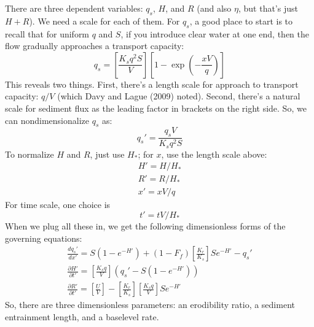 \documentclass[12pt]{amsart}
\begin{document}
There are three dependent variables: $q_s$, $H$, and $R$ (and also $\eta$, but that's just $H+R$). We need a scale for each of them. For $q_s$, a good place to start is to recall that for uniform $q$ and $S$, if you introduce clear water at one end, then the flow gradually approaches a transport capacity:
\begin{equation}
q_s = \left[ \frac{K_s q^2 S}{V} \right] \left[ 1 - \exp \left( -\frac{x V}{q} \right) \right]
\end{equation}
This reveals two things. First, there's a length scale for approach to transport capacity: $q/V$ (which Davy and Lague (2009) noted). Second, there's a natural scale for sediment flux as the leading factor in brackets on the right side. So, we can nondimensionalize $q_s$ as:
\begin{equation}
q_s' = \frac{q_s V}{K_s q^2 S}
\end{equation}
To normalize $H$ and $R$, just use $H_*$; for $x$, use the length scale above:
\begin{eqnarray}
H' = H / H_* \\
R' = R / H_* \\
x' = x V / q
\end{eqnarray}
For time scale, one choice is 
\begin{equation}
t' = t V / H_*
\end{equation}
When we plug all these in, we get the following dimensionless forms of the governing equations:
\begin{eqnarray}
\frac{dq_s'}{dx'} = S \left( 1 - e^{-H'} \right) + (1-F_f) \left[ \frac{K_r}{K_s} \right] S e^{-H'} - q_s' \\
\frac{\partial H'}{\partial t'} = \left[ \frac{K_s q}{V} \right] \left( q_s' - S \left( 1 - e^{-H'} \right) \right) \\
\frac{\partial R'}{\partial t'} = \left[ \frac{U}{V} \right] - \left[ \frac{K_r}{K_s} \right] \left[ \frac{K_s q}{V} \right] S e^{-H'}
\end{eqnarray}
So, there are three dimensionless parameters: an erodibility ratio, a sediment entrainment length, and a baselevel rate.

\end{document}
